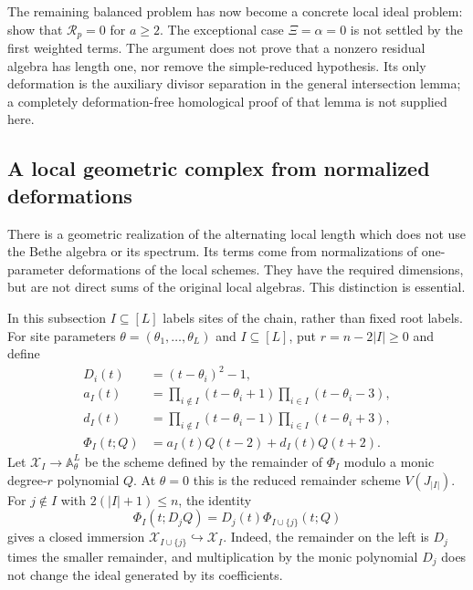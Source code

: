 \documentclass[11pt]{article}
\theoremstyle{definition}
\newcommand{\A}{\mathbb A}
\begin{document}
The remaining balanced problem has now become a concrete local ideal
problem: show that $\mathcal R_p=0$ for $a\ge2$. The exceptional case
$\Xi=\alpha=0$ is not settled by the first weighted terms. The argument
does not prove that a nonzero residual algebra has length one, nor remove
the simple-reduced hypothesis. Its only deformation is the auxiliary
divisor separation in the general intersection lemma; a completely
deformation-free homological proof of that lemma is not supplied here.

\subsection{A local geometric complex from normalized deformations}
\label{sec:normalized-local-complex}

There is a geometric realization of the alternating local length which
does not use the Bethe algebra or its spectrum. Its terms come from
normalizations of one-parameter deformations of the local schemes.
They have the required dimensions, but are not direct sums of the
original local algebras. This distinction is essential.

In this subsection $I\subseteq[L]$ labels sites of the chain, rather
than fixed root labels. For site parameters
$\theta=(\theta_1,\ldots,\theta_L)$ and
$I\subseteq[L]$, put $r=n-2|I|\ge0$ and define
\[
 \begin{aligned}
 D_i(t)&=(t-\theta_i)^2-1,\\
 a_I(t)&=\prod_{i\notin I}(t-\theta_i+1)
          \prod_{i\in I}(t-\theta_i-3),\\
 d_I(t)&=\prod_{i\notin I}(t-\theta_i-1)
          \prod_{i\in I}(t-\theta_i+3),\\
 \Phi_I(t;Q)&=a_I(t)Q(t-2)+d_I(t)Q(t+2).
 \end{aligned}
\]
Let $\mathcal X_I\to\A^L_\theta$ be the scheme defined by the
remainder of $\Phi_I$ modulo a monic degree-$r$ polynomial $Q$.
At $\theta=0$ this is the reduced remainder scheme $V(J_{|I|})$.
For $j\notin I$ with $2(|I|+1)\le n$, the identity
\begin{equation}\label{eq:inhomogeneous-factor-insertion}
 \Phi_I(t;D_jQ)=D_j(t)\Phi_{I\cup\{j\}}(t;Q)
\end{equation}
gives a closed immersion
$\mathcal X_{I\cup\{j\}}\hookrightarrow\mathcal X_I$.
Indeed, the remainder on the left is $D_j$ times the smaller
remainder, and multiplication by the monic polynomial $D_j$ does
not change the ideal generated by its coefficients.
\end{document}
